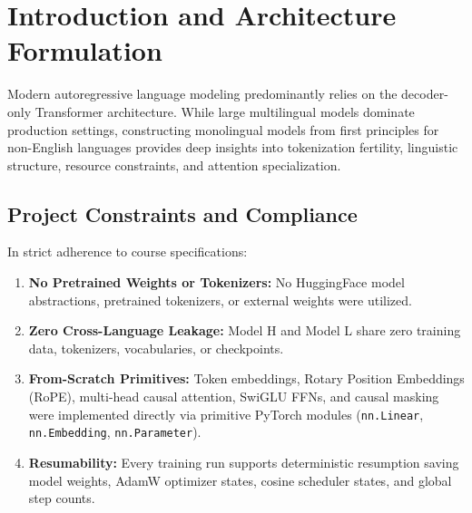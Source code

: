\documentclass[10pt,a4paper]{article}
\begin{document}
\section{Introduction and Architecture Formulation}

Modern autoregressive language modeling predominantly relies on the decoder-only Transformer architecture. While large multilingual models dominate production settings, constructing monolingual models from first principles for non-English languages provides deep insights into tokenization fertility, linguistic structure, resource constraints, and attention specialization.

\subsection{Project Constraints and Compliance}
In strict adherence to course specifications:
\begin{enumerate}[noitemsep,leftmargin=*]
    \item \textbf{No Pretrained Weights or Tokenizers:} No HuggingFace model abstractions, pretrained tokenizers, or external weights were utilized.
    \item \textbf{Zero Cross-Language Leakage:} Model H and Model L share zero training data, tokenizers, vocabularies, or checkpoints.
    \item \textbf{From-Scratch Primitives:} Token embeddings, Rotary Position Embeddings (RoPE), multi-head causal attention, SwiGLU FFNs, and causal masking were implemented directly via primitive PyTorch modules (\texttt{nn.Linear}, \texttt{nn.Embedding}, \texttt{nn.Parameter}).
    \item \textbf{Resumability:} Every training run supports deterministic resumption saving model weights, AdamW optimizer states, cosine scheduler states, and global step counts.
\end{enumerate}
\end{document}
